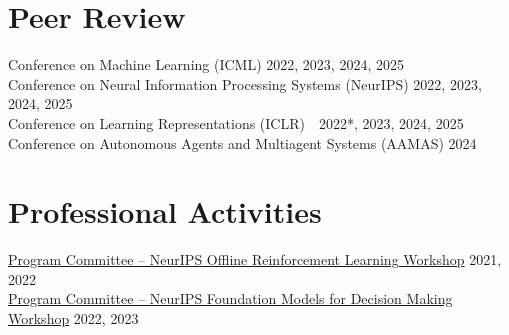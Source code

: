 \documentclass[11pt,letter,sans,colorlinks,linkcolor=true]{moderncv}
\begin{document}
\section{Peer Review}
      Conference on Machine Learning (ICML)
        \hfill 2022, 2023, 2024, 2025 \\
      Conference on Neural Information Processing Systems (NeurIPS)
        \hfill 2022, 2023, 2024, 2025 \\
      Conference on Learning Representations (ICLR)
      \,\, {\scriptsize
        \color{gray}{(*Outstanding Reviewer)}
      } %
        \hfill 2022*, 2023, 2024, 2025 \\
      Conference on Autonomous Agents and Multiagent Systems (AAMAS)
        \hfill 2024 \\


\section{Professional Activities}
      \href{https://offline-rl-neurips.github.io/2021}{Program Committee -- NeurIPS Offline Reinforcement Learning Workshop}
        \hfill 2021, 2022 \\
      \href{https://sites.google.com/view/fmdm-neurips23/}{Program Committee -- NeurIPS Foundation Models for Decision Making Workshop}
        \hfill 2022, 2023 \\
\end{document}
